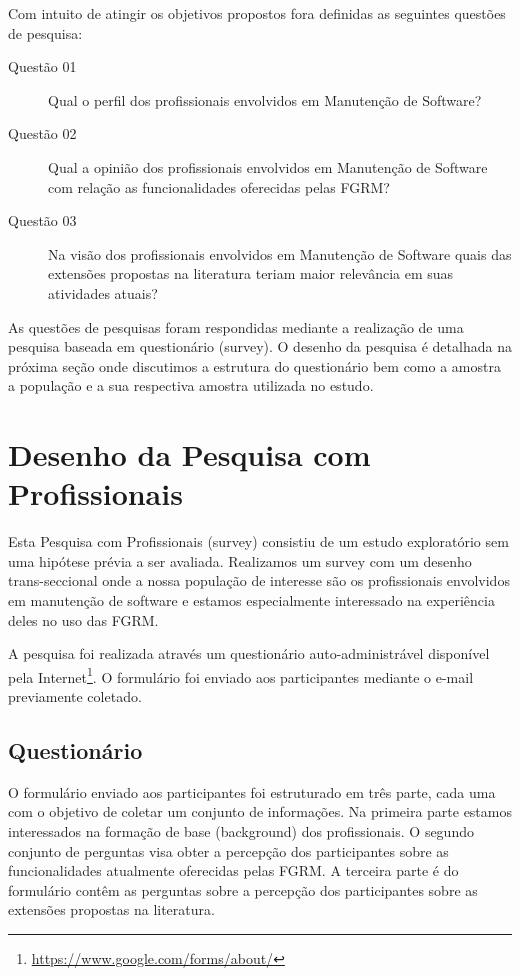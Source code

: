 Com intuito de atingir os objetivos propostos fora definidas as seguintes questões de pesquisa:
\begin{description}
	\item[Questão 01] Qual o perfil dos profissionais envolvidos em Manutenção de Software?
	\item[Questão 02] Qual a opinião dos profissionais envolvidos em Manutenção de Software com
		relação as funcionalidades oferecidas pelas FGRM\@?
	\item [Questão 03] Na visão  dos profissionais envolvidos em Manutenção de Software quais das
		extensões propostas na literatura teriam maior relevância em suas atividades atuais?
\end{description}

As questões de pesquisas foram respondidas mediante a realização de uma pesquisa baseada em
questionário (survey). O desenho da pesquisa é detalhada na próxima seção onde discutimos a estrutura
do questionário bem como a amostra a população e a sua respectiva amostra utilizada no estudo.

\section{Desenho da Pesquisa com Profissionais}
\label{sec:desenho_da_pesquisa_com_profissionais}

Esta Pesquisa com Profissionais (survey) consistiu de um estudo exploratório sem uma hipótese prévia
a ser avaliada. Realizamos um survey com um desenho trans-seccional\cite{kitchenham2002principles} onde a nossa população de
interesse são os profissionais envolvidos em manutenção de software e estamos especialmente
interessado na experiência deles no uso das FGRM\@. 

A pesquisa foi realizada através um questionário auto-administrável disponível pela
Internet\footnote{\url{https://www.google.com/forms/about/}}. O formulário foi enviado aos
participantes mediante o e-mail previamente coletado.


\subsection{Questionário}
\label{subsec:questionario}

O formulário enviado aos participantes foi estruturado em três parte, cada uma com o objetivo de
coletar um conjunto de informações. Na primeira parte estamos interessados na formação de base
(background) dos profissionais. O segundo conjunto de perguntas visa obter a percepção dos
participantes sobre as funcionalidades atualmente oferecidas pelas FGRM\@. A terceira parte é do
formulário contêm as perguntas sobre a percepção dos participantes sobre as extensões propostas na
literatura. 

